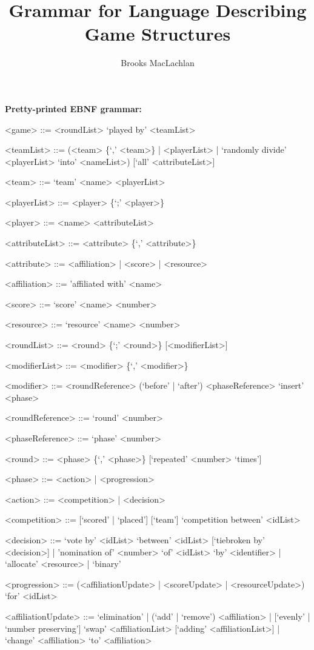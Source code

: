 \documentclass{article}
\title{Grammar for Language Describing Game Structures}
\author{Brooks MacLachlan}
\begin{document}
\maketitle

\noindent \textbf{Pretty-printed EBNF grammar:}
\begin{grammar}
<game> ::= <roundList> `played by' <teamList>

<teamList> ::= (<team> \{`,' <team>\} | <playerList> | `randomly divide' 
<playerList> `into' <nameList>) [`all' <attributeList>]

<team> ::= `team' <name> <playerList>

<playerList> ::= <player> \{`;' <player>\}

<player> ::= <name> <attributeList>

<attributeList> ::= <attribute> \{`,' <attribute>\}

<attribute> ::= <affiliation> | <score> | <resource>

<affiliation> ::= 'affiliated with' <name>

<score> ::= `score' <name> <number> 

<resource> ::= `resource' <name> <number>

<roundList> ::= <round> \{`;' <round>\} [<modifierList>]

<modifierList> ::= <modifier> \{`,' <modifier>\}

<modifier> ::= <roundReference> (`before' | `after') <phaseReference> `insert' 
<phase>

<roundReference> ::= `round' <number>

<phaseReference> ::= `phase' <number>

<round> ::= <phase> \{`,' <phase>\} [`repeated' <number> `times']

<phase> ::= <action> | <progression>

<action> ::= <competition> | <decision>

<competition> ::= [`scored' | `placed'] [`team'] `competition between' <idList>

<decision> ::= `vote by' <idList> `between' <idList> [`tiebroken by' 
<decision>] | 'nomination of' <number> 
`of' <idList> `by' <identifier> | `allocate' <resource> | `binary' %

<progression> ::= (<affiliationUpdate> | <scoreUpdate>  | <resourceUpdate>) 
`for' <idList>

<affiliationUpdate> ::= `elimination' | (`add' | `remove') <affiliation> | 
[`evenly' | `number preserving'] `swap' <affiliationList> [`adding' 
<affiliationList>] | `change' <affiliation> `to' <affiliation>


\end{grammar}
\end{document}
